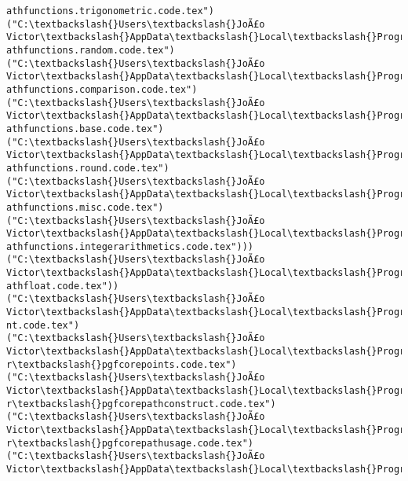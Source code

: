 \documentclass[11pt]{article}
\begin{document}
\begin{Verbatim}[commandchars=\\\{\}]
athfunctions.trigonometric.code.tex")
("C:\textbackslash{}Users\textbackslash{}JoÃ£o Victor\textbackslash{}AppData\textbackslash{}Local\textbackslash{}Programs\textbackslash{}MiKTeX\textbackslash{}tex/generic/pgf/math\textbackslash{}pgfm
athfunctions.random.code.tex")
("C:\textbackslash{}Users\textbackslash{}JoÃ£o Victor\textbackslash{}AppData\textbackslash{}Local\textbackslash{}Programs\textbackslash{}MiKTeX\textbackslash{}tex/generic/pgf/math\textbackslash{}pgfm
athfunctions.comparison.code.tex")
("C:\textbackslash{}Users\textbackslash{}JoÃ£o Victor\textbackslash{}AppData\textbackslash{}Local\textbackslash{}Programs\textbackslash{}MiKTeX\textbackslash{}tex/generic/pgf/math\textbackslash{}pgfm
athfunctions.base.code.tex")
("C:\textbackslash{}Users\textbackslash{}JoÃ£o Victor\textbackslash{}AppData\textbackslash{}Local\textbackslash{}Programs\textbackslash{}MiKTeX\textbackslash{}tex/generic/pgf/math\textbackslash{}pgfm
athfunctions.round.code.tex")
("C:\textbackslash{}Users\textbackslash{}JoÃ£o Victor\textbackslash{}AppData\textbackslash{}Local\textbackslash{}Programs\textbackslash{}MiKTeX\textbackslash{}tex/generic/pgf/math\textbackslash{}pgfm
athfunctions.misc.code.tex")
("C:\textbackslash{}Users\textbackslash{}JoÃ£o Victor\textbackslash{}AppData\textbackslash{}Local\textbackslash{}Programs\textbackslash{}MiKTeX\textbackslash{}tex/generic/pgf/math\textbackslash{}pgfm
athfunctions.integerarithmetics.code.tex")))
("C:\textbackslash{}Users\textbackslash{}JoÃ£o Victor\textbackslash{}AppData\textbackslash{}Local\textbackslash{}Programs\textbackslash{}MiKTeX\textbackslash{}tex/generic/pgf/math\textbackslash{}pgfm
athfloat.code.tex"))
("C:\textbackslash{}Users\textbackslash{}JoÃ£o Victor\textbackslash{}AppData\textbackslash{}Local\textbackslash{}Programs\textbackslash{}MiKTeX\textbackslash{}tex/generic/pgf/math\textbackslash{}pgfi
nt.code.tex")
("C:\textbackslash{}Users\textbackslash{}JoÃ£o Victor\textbackslash{}AppData\textbackslash{}Local\textbackslash{}Programs\textbackslash{}MiKTeX\textbackslash{}tex/generic/pgf/basiclaye
r\textbackslash{}pgfcorepoints.code.tex")
("C:\textbackslash{}Users\textbackslash{}JoÃ£o Victor\textbackslash{}AppData\textbackslash{}Local\textbackslash{}Programs\textbackslash{}MiKTeX\textbackslash{}tex/generic/pgf/basiclaye
r\textbackslash{}pgfcorepathconstruct.code.tex")
("C:\textbackslash{}Users\textbackslash{}JoÃ£o Victor\textbackslash{}AppData\textbackslash{}Local\textbackslash{}Programs\textbackslash{}MiKTeX\textbackslash{}tex/generic/pgf/basiclaye
r\textbackslash{}pgfcorepathusage.code.tex")
("C:\textbackslash{}Users\textbackslash{}JoÃ£o Victor\textbackslash{}AppData\textbackslash{}Local\textbackslash{}Programs\textbackslash{}MiKTeX\textbackslash{}tex/generic/pgf/basiclaye

\end{Verbatim}
\end{document}
